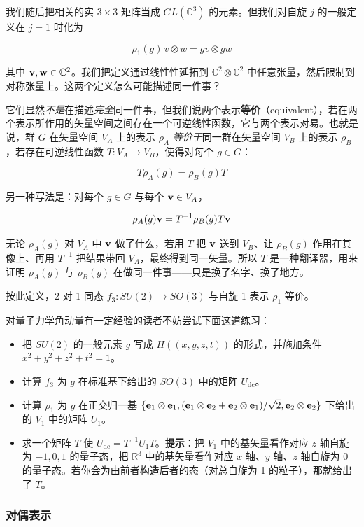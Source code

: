 我们随后把相关的实 $3\times3$ 矩阵当成 $GL(\mathbb{C}^{3})$ 的元素。但我们对自旋-$j$ 的一般定义在 $j=1$ 时化为

\[
\rho_{1}(g)\,v\otimes w=gv\otimes gw
\]

其中 $\mathbf{v},\mathbf{w}\in\mathbb{C}^{2}$。我们把定义通过线性性延拓到 $\mathbb{C}^{2}\otimes\mathbb{C}^{2}$ 中任意张量，然后限制到对称张量上。这两个定义怎么可能描述同一件事？

它们显然\emph{不是}在描述\emph{完全}同一件事，但我们说两个表示\textbf{等价}（equivalent），若在两个表示所作用的矢量空间之间存在一个可逆线性函数，它与两个表示对易。也就是说，群 $G$ 在矢量空间 $V_{A}$ 上的表示 $\rho_{A}$ \emph{等价于}同一群在矢量空间 $V_{B}$ 上的表示 $\rho_{B}$，若存在可逆线性函数 $T:V_{A}\to V_{B}$，使得对每个 $g\in G$：

\[
T\rho_{A}(g)=\rho_{B}(g)T
\]

另一种写法是：对每个 $g\in G$ 与每个 $\mathbf{v}\in V_{A}$，

\[
\rho_{A}(g)\mathbf{v}=T^{-1}\rho_{B}(g)T\mathbf{v}
\]

无论 $\rho_{A}(g)$ 对 $V_{A}$ 中 $\mathbf{v}$ 做了什么，若用 $T$ 把 $\mathbf{v}$ 送到 $V_{B}$、让 $\rho_{B}(g)$ 作用在其像上、再用 $T^{-1}$ 把结果带回 $V_{A}$，最终得到同一矢量。所以 $T$ 是一种翻译器，用来证明 $\rho_{A}(g)$ 与 $\rho_{B}(g)$ 在做同一件事——只是换了名字、换了地方。

按此定义，2 对 1 同态 $f_{3}:SU(2)\to SO(3)$ 与自旋-1 表示 $\rho_{1}$ 等价。

对量子力学角动量有一定经验的读者不妨尝试下面这道练习：

\begin{itemize}
  \item 把 $SU(2)$ 的一般元素 $g$ 写成 $H((x,y,z,t))$ 的形式，并施加条件 $x^{2}+y^{2}+z^{2}+t^{2}=1$。
  \item 计算 $f_{3}$ 为 $g$ 在标准基下给出的 $SO(3)$ 中的矩阵 $U_{\text{dc}}$。
  \item 计算 $\rho_{1}$ 为 $g$ 在正交归一基 $\{\mathbf{e}_{1}\otimes\mathbf{e}_{1},(\mathbf{e}_{1}\otimes\mathbf{e}_{2}+\mathbf{e}_{2}\otimes\mathbf{e}_{1})/\sqrt{2},\mathbf{e}_{2}\otimes\mathbf{e}_{2}\}$ 下给出的 $V_{1}$ 中的矩阵 $U_{1}$。
  \item 求一个矩阵 $T$ 使 $U_{\text{dc}}=T^{-1}U_{1}T$。\textbf{提示}：把 $V_{1}$ 中的基矢量看作对应 $z$ 轴自旋为 $-1,0,1$ 的量子态，把 $\mathbb{R}^{3}$ 中的基矢量看作对应 $x$ 轴、$y$ 轴、$z$ 轴自旋为 0 的量子态。若你会为由前者构造后者的态（对总自旋为 1 的粒子），那就给出了 $T$。
\end{itemize}

\subsubsection{对偶表示}

